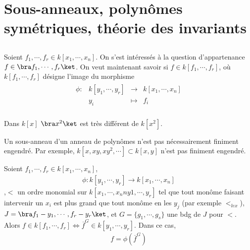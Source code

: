 \chapter{Sous-anneaux, polynômes symétriques, théorie des invariants}
    \section{}
        Soient $f_1, \cdots, f_r \in k[x_1, \cdots, x_n]$. On s'est intéressés à la question d'appartenance $f \in \bra f_1, \cdots, f_r \ket$. On veut maintenant savoir si $f \in k[f_1, \cdots, f_r]$, où $k[f_1, \cdots, f_r]$ désigne l'image du morphisme 
        \begin{align*}
            \begin{array}{cccc}
                \phi : & k[y_1, \cdots, y_r] & \to & k[x_1, \cdots, x_n] \\
                & y_i & \mapsto & f_i \\
            \end{array}
        \end{align*}
        \begin{expl}
            Dans $k[x]$ $\bra x^2 \ket$ est très différent de $k[x^2]$.
        \end{expl}
        \begin{remq}
            Un sous-anneau d'un anneau de polynômes n'est pas nécessairement finiment engendré. Par exemple, $k[x, xy, xy^2, \cdots] \subset k[x,y]$ n'est pas finiment engendré.
        \end{remq}
        \begin{prop}
            Soient $f_1, \cdots, f_r \in k[x_1, \cdots, x_n]$, 
            \begin{align*}
                \phi : k[y_1, \cdots, y_r] \to k[x_1, \cdots, x_n]
            \end{align*}
            ,$<$ un ordre monomial sur $k[x_1, \cdots, x_nn y1, \cdots, y_r]$ tel que tout monôme faisant intervenir un $x_i$ est plus grand que tout monôme en les $y_j$ (par exemple $<_{lex}$), $J = \bra f_1 - y_1, \cdots, f_r - y_r \ket$, et $G = \{g_1, \cdots, g_s\}$ une bdg de $J$ pour $<$. Alors $f \in k[f_1, \cdots, f_r] \iff \overline{f}^G \in k[y_1, \cdots, y_r]$. Dans ce cas,
            \begin{align*}
                f = \phi(\overline{f}^G)
            \end{align*}
        \end{prop}
